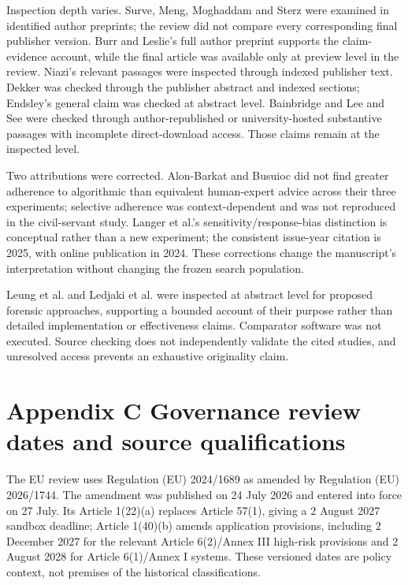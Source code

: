 \documentclass[11pt]{article}
\begin{document}
Inspection depth varies. Surve, Meng, Moghaddam and Sterz were examined in identified author preprints; the review did not compare every corresponding final publisher version. Burr and Leslie's full author preprint supports the claim-evidence account, while the final article was available only at preview level in the review. Niazi's relevant passages were inspected through indexed publisher text. Dekker was checked through the publisher abstract and indexed sections; Endsley's general claim was checked at abstract level. Bainbridge and Lee and See were checked through author-republished or university-hosted substantive passages with incomplete direct-download access. Those claims remain at the inspected level.

Two attributions were corrected. Alon-Barkat and Busuioc did not find greater adherence to algorithmic than equivalent human-expert advice across their three experiments; selective adherence was context-dependent and was not reproduced in the civil-servant study. Langer et al.'s sensitivity/response-bias distinction is conceptual rather than a new experiment; the consistent issue-year citation is 2025, with online publication in 2024. These corrections change the manuscript's interpretation without changing the frozen search population.

Leung et al. and Ledjaki et al. were inspected at abstract level for proposed forensic approaches, supporting a bounded account of their purpose rather than detailed implementation or effectiveness claims. Comparator software was not executed. Source checking does not independently validate the cited studies, and unresolved access prevents an exhaustive originality claim.

\clearpage
{}
\section*{Appendix C Governance review dates and source qualifications}

The EU review uses Regulation (EU) 2024/1689 as amended by Regulation (EU) 2026/1744. The amendment was published on 24 July 2026 and entered into force on 27 July. Its Article 1(22)(a) replaces Article 57(1), giving a 2 August 2027 sandbox deadline; Article 1(40)(b) amends application provisions, including 2 December 2027 for the relevant Article 6(2)/Annex III high-risk provisions and 2 August 2028 for Article 6(1)/Annex I systems. These versioned dates are policy context, not premises of the historical classifications.
\end{document}
